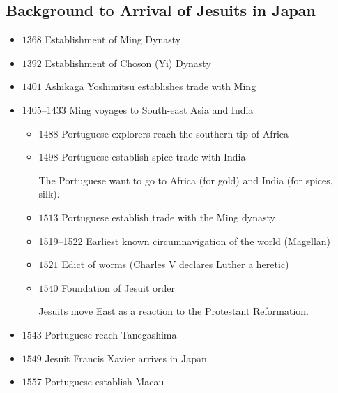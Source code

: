 \documentclass[class=article, crop=false]{standalone}
\begin{document}
  \subsection{Background to Arrival of Jesuits in Japan}
  \begin{itemize}
    \item $1368$ Establishment of Ming Dynasty
    \item $1392$ Establishment of Choson (Yi) Dynasty
    \item $1401$ Ashikaga Yoshimitsu establishes trade with Ming
    \item 1405--1433 Ming voyages to South-east Asia and India
    \begin{itemize}
      \item $1488$ Portuguese explorers reach the southern tip of Africa
      \item $1498$ Portuguese establish spice trade with India
      \begin{note}{}
        The Portuguese want to go to Africa (for gold) and India (for spices, silk).
      \end{note}
      \item $1513$ Portuguese establish trade with the Ming dynasty
      \item 1519--1522 Earliest known circumnavigation of the world (Magellan)
      \item $1521$ Edict of worms (Charles V declares Luther a heretic)
      \item $1540$ Foundation of Jesuit order
      \begin{note}{}
        Jesuits move East as a reaction to the Protestant Reformation.
      \end{note}
    \end{itemize}
    \item $1543$ Portuguese reach Tanegashima
    \item $1549$ Jesuit Francis Xavier arrives in Japan
    \item $1557$ Portuguese establish Macau
  \end{itemize}
\end{document}
